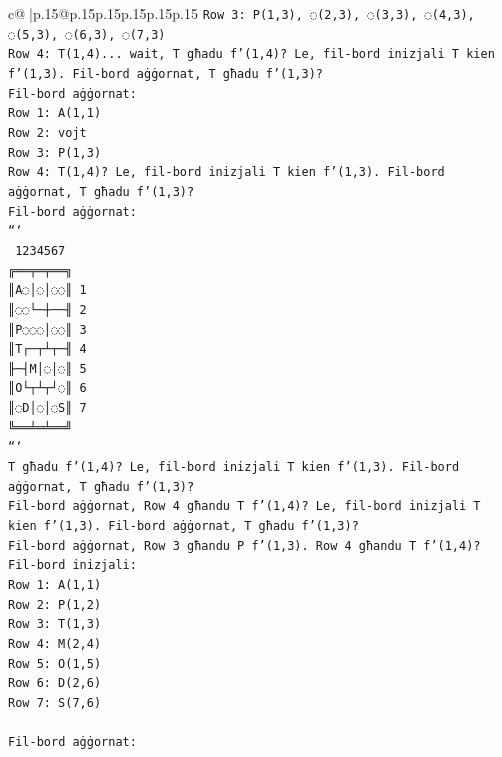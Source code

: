 \documentclass{article}
\begin{document}
{\begin{supertabular}{c@{$\;$}|p{.15\linewidth}@{}p{.15\linewidth}p{.15\linewidth}p{.15\linewidth}p{.15\linewidth}p{.15\linewidth}}
{{{\texttt{Row 3: P(1,3), ◌(2,3), ◌(3,3), ◌(4,3), ◌(5,3), ◌(6,3), ◌(7,3)} \\
\texttt{Row 4: T(1,4)... wait, T għadu f'(1,4)? Le, fil{-}bord inizjali T kien f'(1,3). Fil{-}bord aġġornat, T għadu f'(1,3)?} \\
\texttt{Fil{-}bord aġġornat:} \\
\texttt{Row 1: A(1,1)} \\
\texttt{Row 2: vojt} \\
\texttt{Row 3: P(1,3)} \\
\texttt{Row 4: T(1,4)? Le, fil{-}bord inizjali T kien f'(1,3). Fil{-}bord aġġornat, T għadu f'(1,3)?} \\
\texttt{Fil{-}bord aġġornat:} \\
\texttt{```} \\
\texttt{ 1234567} \\
\texttt{╔══╤═╤══╗} \\
\texttt{║A◌│◌│◌◌║ 1} \\
\texttt{║◌◌└─┼──╢ 2} \\
\texttt{║P◌◌◌│◌◌║ 3} \\
\texttt{║T┌─┬┴┬─╢ 4} \\
\texttt{╟─┤M│◌│◌║ 5} \\
\texttt{║O└┬┴┬┘◌║ 6} \\
\texttt{║◌D│◌│◌S║ 7} \\
\texttt{╚══╧═╧══╝} \\
\texttt{```} \\
\texttt{T għadu f'(1,4)? Le, fil{-}bord inizjali T kien f'(1,3). Fil{-}bord aġġornat, T għadu f'(1,3)?} \\
\texttt{Fil{-}bord aġġornat, Row 4 għandu T f'(1,4)? Le, fil{-}bord inizjali T kien f'(1,3). Fil{-}bord aġġornat, T għadu f'(1,3)?} \\
\texttt{Fil{-}bord aġġornat, Row 3 għandu P f'(1,3). Row 4 għandu T f'(1,4)?} \\
\texttt{Fil{-}bord inizjali:} \\
\texttt{Row 1: A(1,1)} \\
\texttt{Row 2: P(1,2)} \\
\texttt{Row 3: T(1,3)} \\
\texttt{Row 4: M(2,4)} \\
\texttt{Row 5: O(1,5)} \\
\texttt{Row 6: D(2,6)} \\
\texttt{Row 7: S(7,6)} \\
\\ 
\texttt{Fil{-}bord aġġornat:} \\
}}}
\end{supertabular}}
\end{document}
